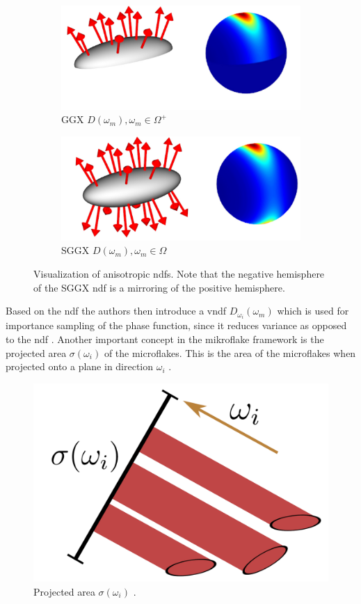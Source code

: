 \begin{figure}[!ht]
    \centering
    \begin{subfigure}[b]{0.45\linewidth}
        \centering
        \includegraphics[width=\linewidth]{img/sggx_ndf_a.jpg}
        \caption{GGX $D(\omega_m), \omega_m \in \Omega^+$ \cite[p. 3]{sggx}}
        \label{fig:sggx_ndf_a}
    \end{subfigure}
    \begin{subfigure}[b]{0.45\linewidth}
        \centering
        \includegraphics[width=1\linewidth]{img/sggx_ndf_b.jpg}
        \caption{SGGX $D(\omega_m), \omega_m \in \Omega$ \cite[p. 3]{sggx}}
        \label{fig:sggx_ndf_b}
    \end{subfigure}
	\caption{Visualization of anisotropic \acsp{ndf}. Note that the negative hemisphere of the SGGX \acs{ndf} is a mirroring of the positive hemisphere.}
	\label{img:sggx_ndf}
\end{figure}
Based on the \acs{ndf} the authors then introduce a \ac{vndf} $D_{\omega_i}(\omega_m)$ which is used for importance sampling of the phase function, since it reduces variance as opposed to the \acs{ndf} \cite[p. 9]{vndf_importance_sampling}.
Another important concept in the mikroflake framework is the projected area $\sigma(\omega_i)$ of the microflakes.
This is the area of the microflakes when projected onto a plane in direction $\omega_i$ \cite[p. 3]{sggx}.
\begin{figure}[!ht]
    \centering
    \includegraphics[width=0.3\linewidth]{img/sggx_projected_area.png}
    \caption{Projected area $\sigma(\omega_i)$ \cite[p. 2]{sggx}.}
    \label{fig:sggx_projected_area}
\end{figure}
